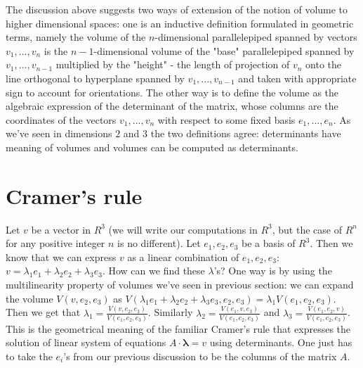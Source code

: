 The discussion above suggests two ways of extension of the notion of volume to higher dimensional spaces: one is an inductive definition formulated in geometric terms, namely the volume of the $n$-dimensional parallelepiped spanned by vectors $v_1,...,v_n$ is the $n-1$-dimensional volume of the "base" parallelepiped spanned by $v_1,...,v_{n-1}$ multiplied by the "height" - the length of projection of $v_n$ onto the line orthogonal to hyperplane spanned by $v_1,...,v_{n-1}$ and taken with appropriate sign to account for orientations. The other way is to define the volume as the algebraic expression of the determinant of the matrix, whose columns are the coordinates of the vectors $v_1,...,v_n$ with respect to some fixed basis $e_1,...,e_n$. As we've seen in dimensions $2$ and $3$ the two definitions agree: determinants have meaning of volumes and volumes can be computed as determinants.
\section{Cramer's rule}
Let $v$ be a vector in $R^3$ (we will write our computations in $R^3$, but the case of $R^n$ for any positive integer $n$ is no different). Let $e_1,e_2,e_3$ be a basis of $R^3$. Then we know that we can express $v$ as a linear combination of $e_1,e_2,e_3$: $v=\lambda_1 e_1+\lambda_2 e_2+\lambda_3 e_3$. How can we find these $\lambda$'s?
One way is by using the multilinearity property of volumes we've seen in previous section: we can expand the volume $V(v,e_2,e_3)$ as $V(\lambda_1 e_1+\lambda_2 e_2+\lambda_3 e_3,e_2,e_3)=\lambda_1 V(e_1,e_2,e_3)$. Then we get that $\lambda_1=\frac{V(v,e_2,e_3)}{V(e_1,e_2,e_3)}$. Similarly $\lambda_2=\frac{V(e_1,v,e_3)}{V(e_1,e_2,e_3)}$ and $\lambda_3=\frac{V(e_1,e_2,v)}{V(e_1,e_2,e_3)}$.
This is the geometrical meaning of the familiar Cramer's rule that expresses the solution of linear system of equations $A\cdot \mathbf{\lambda}=v$ using determinants. One just has to take the $e_i$'s from our previous discussion to be the columns of the matrix $A$.

